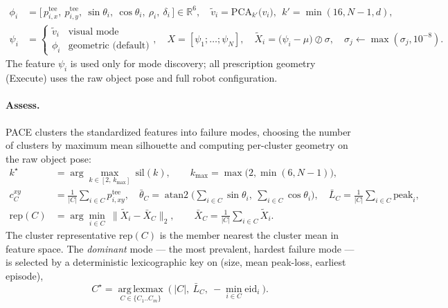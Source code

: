 \documentclass[letterpaper]{article} %
\begin{document}
\begin{align}
\phi_i&=\big[\,p^{\mathrm{tee}}_{i,x},\ p^{\mathrm{tee}}_{i,y},\ \sin\theta_i,\ \cos\theta_i,\ \rho_i,\ \delta_i\,\big]\in\mathbb{R}^6,
\quad
\tilde v_i=\mathrm{PCA}_{k'}\big(v_i\big),\ \ k'=\min(16,N-1,d), \nonumber\\
\psi_i&=\begin{cases}\tilde v_i & \text{visual mode}\\[2pt]\phi_i & \text{geometric (default)}\end{cases},
\quad
X=[\psi_1;\dots;\psi_N],\quad
\tilde X_i=\big(\psi_i-\mu\big)\oslash\sigma,\quad \sigma_j\!\leftarrow\!\max(\sigma_j,10^{-8}).
\label{eq:phi}
\end{align}
The feature $\psi_i$ is used only for mode discovery; all prescription geometry
(Execute) uses the raw object pose and full robot configuration.

\paragraph{Assess.}
PACE clusters the standardized features into failure modes, choosing the number of
clusters by maximum mean silhouette \cite{lloyd1982kmeans} and computing per-cluster
geometry on the raw object pose:
\begin{align}
k^\star&=\arg\max_{k\in[2,\,k_{\max}]}\ \mathrm{sil}(k),\qquad k_{\max}=\max\!\big(2,\min(6,N-1)\big),\nonumber\\
c^{xy}_{C}&=\tfrac{1}{|C|}\!\sum_{i\in C}p^{\mathrm{tee}}_{i,xy},\quad
\bar\theta_{C}=\operatorname{atan2}\!\Big(\!\sum_{i\in C}\!\sin\theta_i,\ \sum_{i\in C}\!\cos\theta_i\Big),\quad
\bar L_{C}=\tfrac{1}{|C|}\!\sum_{i\in C}\mathrm{peak}_i,\nonumber\\
\mathrm{rep}(C)&=\arg\min_{i\in C}\ \big\|\tilde X_i-\bar X_{C}\big\|_2,\qquad
\bar X_{C}=\tfrac1{|C|}\!\sum_{i\in C}\tilde X_i.
\label{eq:partition}
\end{align}
The cluster representative $\mathrm{rep}(C)$ is the member nearest the cluster mean
in feature space. The \emph{dominant} mode --- the most prevalent, hardest failure
mode --- is selected by a deterministic lexicographic key on (size, mean peak-loss,
earliest episode),
\begin{equation}
C^\star=\operatorname*{arg\,lexmax}_{C\in\{C_1..C_m\}}\ \big(\ |C|,\ \bar L_{C},\ -\!\min_{i\in C}\mathrm{eid}_i\ \big).
\label{eq:dominant}
\end{equation}
\end{document}
